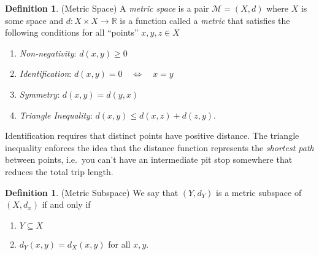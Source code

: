 \documentclass[12pt]{article}
\theoremstyle{plain}
\theoremstyle{definition}
\newtheorem{defn}[thm]{Definition}
\theoremstyle{remark}
\newcommand{\R}{\mathbb{R}}
\begin{document}
\begin{defn}{(Metric Space)}
\label{defn:metric}
A \emph{metric space} is a pair $\mathscr{M}=(X,d)$ where $X$ is some
space and $d:X\times X\rightarrow \R$ is a function
called a \emph{metric} that satisfies the following conditions for all
``points'' $x,y,z\in X$
\begin{enumerate}
  \item \emph{Non-negativity}: $d(x,y)\geq 0$
  \item \emph{Identification}: $d(x,y) = 0 \quad \Leftrightarrow \quad x=y$
  \item \emph{Symmetry}: $d(x,y)=d(y,x)$
  \item \emph{Triangle Inequality}: $d(x,y) \leq d(x,z) + d(z,y)$.
\end{enumerate}
Identification requires that distinct points have positive distance.
The triangle inequality enforces the idea that the distance function
represents the \emph{shortest path} between points, i.e.\ you can't have
an intermediate pit stop somewhere that reduces the total trip length.
\end{defn}
\begin{defn}{(Metric Subspace)}
We say that $(Y,d_Y)$ is a metric subspace of $(X,d_x)$ if and only if
\begin{enumerate}
  \item $Y\subseteq X$
  \item $d_Y(x,y) = d_X(x,y)$ for all $x,y$.
\end{enumerate}
\end{defn}
\end{document}

